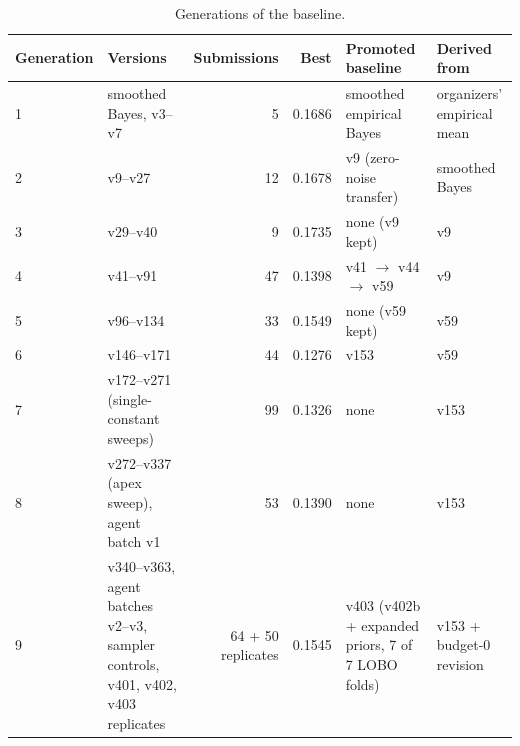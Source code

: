 \documentclass{article}
\begin{document}
\begin{table}[h]
\caption{Generations of the baseline.}
\label{tab:generations}
\centering\small
\begin{tabular}{lp{3.9cm}rrp{4.3cm}p{2.4cm}}
\toprule
Generation & Versions & Submissions & Best & Promoted baseline & Derived from \\
\midrule
1 & smoothed Bayes, v3--v7 & 5 & 0.1686 & smoothed empirical Bayes & organizers' empirical mean \\
2 & v9--v27 & 12 & 0.1678 & v9 (zero-noise transfer) & smoothed Bayes \\
3 & v29--v40 & 9 & 0.1735 & none (v9 kept) & v9 \\
4 & v41--v91 & 47 & 0.1398 & v41 $\to$ v44 $\to$ v59 & v9 \\
5 & v96--v134 & 33 & 0.1549 & none (v59 kept) & v59 \\
6 & v146--v171 & 44 & 0.1276 & v153 & v59 \\
7 & v172--v271 (single-constant sweeps) & 99 & 0.1326 & none & v153 \\
8 & v272--v337 (apex sweep), agent batch v1 & 53 & 0.1390 & none & v153 \\
9 & v340--v363, agent batches v2--v3, sampler controls, v401, v402, v403 replicates & 64 + 50 replicates & 0.1545 & v403 (v402b + expanded priors, 7 of 7 LOBO folds) & v153 + budget-0 revision \\
\bottomrule
\end{tabular}
\end{table}
\end{document}
